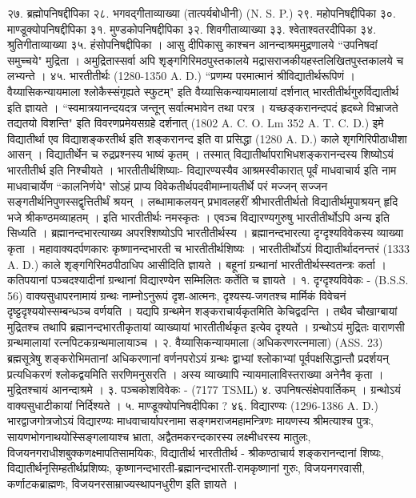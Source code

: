 २७. ब्रह्मोपनिषद्दीपिका
२८. भगवद्गीताव्याख्या (तात्पर्यबोधीनी) (N. S. P.)
२९. महोपनिषद्दीपिका
३०. माण्डूक्योपनिषद्दीपिका
३१. मुण्डकोपनिषद्दीपिका
३२. शिवगीताव्याख्या
३३. श्वेताश्वतरदीपिका
३४. श्रुतिगीताव्याख्या 
३५. हंसोपनिषद्दीपिका । आसु दीपिकासु काश्चन आनन्दाश्रममुद्रणालये ``उपनिषदां समुच्चये" मुद्रिता । अमुद्रितास्सर्वा अपि शृङ्गगिरिमठपुस्तकालये मद्रासराजकीयहस्तलिखितपुस्तकालये च लभ्यन्ते ।
४५. भारतीतीर्थः (1280-1350 A. D.)
``प्रणम्य परमात्मानं श्रीविद्यातीर्थरूपिणं । वैय्यासिकन्यायमाला श्लोकैस्संगृह्यते स्फुटम्" इति वैय्यासिकन्यायमालायां दर्शनात् भारतीतीर्थगुरुर्विद्यातीर्थ इति ज्ञायते । ``स्वमात्रयानन्दयदत्र जन्तून् सर्वात्मभावेन तथा परत्र । यच्छङ्करानन्दपदं हृदब्जे विभ्राजते तद्यतयो विशन्ति" इति विवरणप्रमेयसग्रहे दर्शनात् (1802 A. C. O. Lm 352 A. T. C. D.) इमे विद्यातीर्था एव विद्याशङ्करतीर्थ इति शङ्करानन्द इति वा प्रसिद्धा (1280 A. D.) काले शृगगिरिपीठाधीशा आसन् । विद्यातीर्थेन च रुद्रप्रश्नस्य भाष्यं कृतम् । तस्मात् विद्यातीर्थापराभिधशङ्करानन्दस्य शिष्योऽयं भारतीतीर्थ इति निश्चीयते ।
भारतीतीर्थशिष्याः-
विद्यारण्यस्यैव आश्रमस्वीकारात् पूर्वं माधवाचार्य इति नाम माधवाचार्येण ``कालनिर्णये" सोऽहं प्राप्य विवेकतीर्थपदवीमाम्नायतीर्थे परं मज्जन् सज्जन सङ्गतीर्थनिपुणस्सद्वृत्तितीर्थं श्रयन् । लब्धामाकलयन् प्रभावलहरीं श्रीभारतीतीर्थतो विद्यातीर्थमुपाश्रयन् हृदि भजे श्रीकण्ठमव्याहतम् । इति भारतीतीर्थः नमस्कृतः । एवञ्च विद्यारण्यगुरुषु भारतीतीर्थोऽपि अन्य इति सिध्यति । ब्रह्मानन्दभारत्याख्य अपरश्शिष्योऽपि भारतीतीर्थस्य । ब्रह्मानन्दभारत्या दृग्दृश्यविवेकस्य व्याख्या कृता । महावाक्यदर्पणकारः कृष्णानन्दभारती च भारतीतीर्थशिष्यः ।
भारतीतीर्थोऽयं विद्यातीर्थादनन्तरं (1333 A. D.) काले शृङ्गगिरिमठपीठाधिप आसीदिति ज्ञायते । बहूनां ग्रन्थानां भारतीतीर्थस्स्वतन्त्रः कर्ता । कतिपयानां पञ्चदश्यादीनां ग्रन्थानां विद्यारण्येन सम्मिलितः कर्तेति च ज्ञायते ।
१. दृग्दृश्यविवेकः - (B.S.S. 56)
वाक्यसुधापरनामायं ग्रन्थः नाम्नोऽनुरूपं दृश-आत्मनः, दृश्यस्य-जगतश्च मार्मिकं विवेचनं दृष्ट्टदृश्ययोस्सम्बन्धञ्च वर्णयति । यद्यपि ग्रन्थमेन शङ्कराचार्यकृतमिति केचिद्वदन्ति । तथैव चौखाग्बायां मुद्रितश्च तथापि ब्रह्मानन्दभारतीकृतायां व्याख्यायां भारतीतीर्थकृत इत्येव दृश्यते । ग्रन्थोऽयं मुद्रितः वाराणसी ग्रन्थमालायां रत्नपिटकग्रन्थमालायाञ्च ।
२. वैय्यासिकन्यायमाला (अधिकरणरत्नमाला) (ASS. 23)
ब्रह्मसूत्रेषु शङ्करोभिमतानां अधिकरणानां वर्णनपरोऽयं ग्रन्थः द्वाभ्यां श्लोकाभ्यां पूर्वपक्षसिद्धान्तौ प्रदर्शयन् प्रत्यधिकरणं श्लोकद्वयमिति सरणिमनुसरति । अस्य व्याख्यापि न्यायमालाविस्तराख्या अनेनैव कृता । मुद्रितश्चायं आनन्दाश्रमे । 
३. पञ्चकोशविवेकः - (7177 TSML)
४. उपनिषत्संक्षेपवार्तिकम् । ग्रन्थोऽयं वाक्यसुधाटीकायां निर्दिश्यते ।
५. माण्डूक्योपनिषदीपिका ?
४६. विद्यारण्यः (1296-1386 A. D.)
भारद्वाजगोत्रजोऽयं विद्यारण्यः माधवाचार्यापरनामा सङ्गमराजमहामन्त्रिणः मायणस्य श्रीमत्याश्च पुत्रः, सायणभोगनाथयोस्सिङ्गलायाश्च भ्राता, अद्वैतमकरन्दकारस्य लक्ष्मीधरस्य मातुलः, विजयनगराधीशबुक्कणक्ष्मापतिसामयिकः, विद्यातीर्थ भारतीतीर्थ - श्रीकण्ठाचार्य शङ्करानन्दानां शिष्यः, विद्यातीर्थनृसिम्हतीर्थप्रशिष्यः, कृष्णानन्दभारती-ब्रह्मानन्दभारती-रामकृष्णानां गुरुः, विजयनगरवासी, कर्णाटकब्राह्मणः, विजयनरसाम्राज्यस्थापनधुरीण इति ज्ञायते ।
